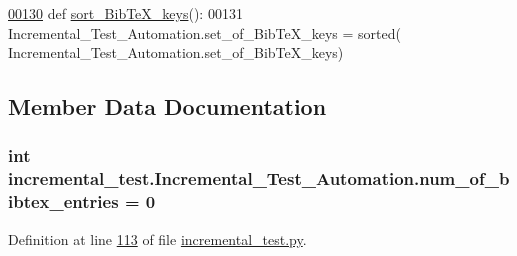 \begin{DoxyCode}
\hypertarget{classincremental__test_1_1Incremental__Test__Automation_l00130}{}\hyperlink{classincremental__test_1_1Incremental__Test__Automation_a856c60714b5d716d5eb630cbc3d55d09}{00130}     \textcolor{keyword}{def }\hyperlink{classincremental__test_1_1Incremental__Test__Automation_a856c60714b5d716d5eb630cbc3d55d09}{sort\_BibTeX\_keys}():
00131         Incremental\_Test\_Automation.set\_of\_BibTeX\_keys = sorted(
      Incremental\_Test\_Automation.set\_of\_BibTeX\_keys)
\end{DoxyCode}


\subsection{Member Data Documentation}
\hypertarget{classincremental__test_1_1Incremental__Test__Automation_ac60587acca9d28d055bd8a7198a987a1}{}
\subsubsection[{num\+\_\+of\+\_\+bibtex\+\_\+entries}]{\setlength{\rightskip}{0pt plus 5cm}int incremental\+\_\+test.\+Incremental\+\_\+\+Test\+\_\+\+Automation.\+num\+\_\+of\+\_\+bibtex\+\_\+entries = 0\hspace{0.3cm}{\ttfamily [static]}}\label{classincremental__test_1_1Incremental__Test__Automation_ac60587acca9d28d055bd8a7198a987a1}


Definition at line \hyperlink{incremental__test_8py_source_l00113}{113} of file \hyperlink{incremental__test_8py_source}{incremental\+\_\+test.\+py}.

\hypertarget{classincremental__test_1_1Incremental__Test__Automation_a8f5272e0488026aa24a829262392f2f7}{}
